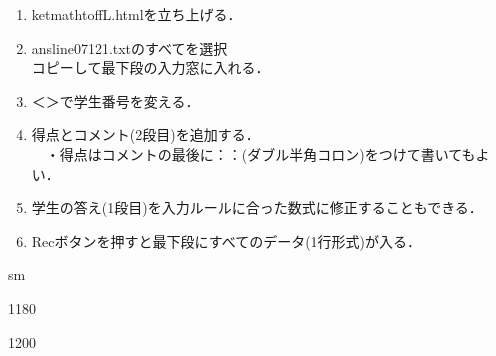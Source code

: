 \documentclass[landscape,10pt]{ujarticle}
\newcommand{\slidepage}[1][s]{%
\setcounter{ketpicctra}{18}%
\if#1m \setcounter{ketpicctra}{1}\fi
\hypersetup{linkcolor=black}%

\begin{layer}{118}{0}
\putnotee{122}{-\theketpicctra.05}{\small\thepage/\pageref{pageend}}
\end{layer}\hypersetup{linkcolor=blue}

}
\begin{document}
\begin{enumerate}[(1)]
\item
ketmathtoffL.htmlを立ち上げる．\vspace{-2mm}
\item
ansline07121.txtのすべてを選択\\
コピーして最下段の入力窓に入れる．\vspace{-2mm}\\
\item
＜＞で学生番号を変える．\vspace{-2mm}
\item
得点とコメント(2段目)を追加する．\\
　・得点はコメントの最後に：\hspace{-2mm}：(ダブル半角コロン)をつけて書いてもよい．\vspace{-2mm}
\item
学生の答え(1段目)を入力ルールに合った数式に修正することもできる．\vspace{-2mm}
\item
Recボタンを押すと最下段にすべてのデータ(1行形式)が入る．\vspace{-2mm}
\end{enumerate}

\sameslide

\vspace*{18mm}

\slidepage

\begin{layer}{120}{0}
\end{layer}
\end{document}
